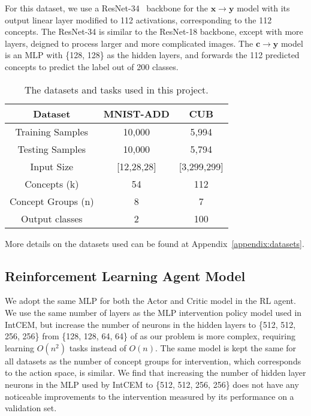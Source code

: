 For this dataset, we use a ResNet-34~\cite{resnet} backbone for the $\mathbf{x} \to \mathbf{y}$
model with its output linear layer modified to 112 activations, corresponding
to the 112 concepts. The ResNet-34 is similar to the ResNet-18 backbone,
except with more layers, deigned to process larger and more complicated images.
The $\mathbf{c} \to \mathbf{y}$ model is an MLP with \{128, 128\} as the hidden
layers, and forwards the 112 predicted concepts to predict the label out of 200 classes.


\begin{table}
    \centering
    \renewcommand{\arraystretch}{1.5}
    \begin{tabular}{c|cc}

    Dataset & MNIST-ADD & CUB \\
    \hline
    Training Samples & 10,000 & 5,994 \\
    Testing Samples & 10,000 & 5,794 \\
    Input Size & [12,28,28] & [3,299,299]\\
    Concepts (k) & 54 & 112 \\
    Concept Groups (n) & 8 & 7 \\
    Output classes & 2 & 100
    \end{tabular}
    \caption{The datasets and tasks used in this project.}
    \label{table:datasets}
\end{table}

More details on the datasets used can be found at Appendix~\ref{appendix:datasets}.

\subsection{Reinforcement Learning Agent Model}
We adopt the same MLP for 
both the Actor and Critic model in the RL agent. 
We use the same number of layers as the MLP intervention policy
 model used in IntCEM, but increase the number of neurons in the hidden layers
 to \{512, 512, 256, 256\} from \{128, 128, 64, 64\}
 of as 
 our problem is more complex, requiring 
 learning $O(n^2)$ tasks instead of $O(n)$.
 The same model is kept 
 the same for all datasets as the number of concept groups for intervention,
 which corresponds to the action space,
 is similar. We find that increasing the number of hidden layer neurons
 in the MLP used by 
 IntCEM to \{512, 512, 256, 256\} does not have any noticeable improvements
 to the intervention measured by its performance
 on a validation set.
    
